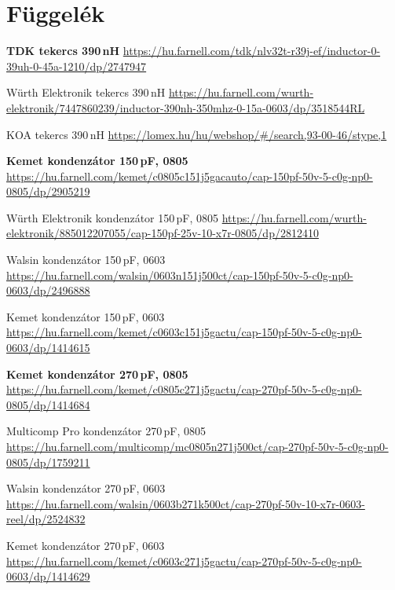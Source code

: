 \section*{Függelék}
\label{sec:fuggelek}

\begin{thebibliography}{1}
	
	 \textbf{TDK tekercs 390\,nH} \url{https://hu.farnell.com/tdk/nlv32t-r39j-ef/inductor-0-39uh-0-45a-1210/dp/2747947}
	
	 Würth Elektronik tekercs 390\,nH \url{https://hu.farnell.com/wurth-elektronik/7447860239/inductor-390nh-350mhz-0-15a-0603/dp/3518544RL}
	
	 KOA tekercs 390\,nH \url{https://lomex.hu/hu/webshop/#/search,93-00-46/stype,1}
	
	 \textbf{Kemet kondenzátor 150\,pF, 0805} \url{https://hu.farnell.com/kemet/c0805c151j5gacauto/cap-150pf-50v-5-c0g-np0-0805/dp/2905219}
	
	 Würth Elektronik kondenzátor 150\,pF, 0805 \url{https://hu.farnell.com/wurth-elektronik/885012207055/cap-150pf-25v-10-x7r-0805/dp/2812410}
	
	 Walsin kondenzátor 150\,pF, 0603 \url{https://hu.farnell.com/walsin/0603n151j500ct/cap-150pf-50v-5-c0g-np0-0603/dp/2496888}
	
	 Kemet kondenzátor 150\,pF, 0603 \url{https://hu.farnell.com/kemet/c0603c151j5gactu/cap-150pf-50v-5-c0g-np0-0603/dp/1414615}
	
	 \textbf{Kemet kondenzátor 270\,pF, 0805} \url{https://hu.farnell.com/kemet/c0805c271j5gactu/cap-270pf-50v-5-c0g-np0-0805/dp/1414684}
	
	 Multicomp Pro kondenzátor 270\,pF, 0805 \url{https://hu.farnell.com/multicomp/mc0805n271j500ct/cap-270pf-50v-5-c0g-np0-0805/dp/1759211}
	
	 Walsin kondenzátor 270\,pF, 0603 \url{https://hu.farnell.com/walsin/0603b271k500ct/cap-270pf-50v-10-x7r-0603-reel/dp/2524832}
	
	 Kemet kondenzátor 270\,pF, 0603 \url{https://hu.farnell.com/kemet/c0603c271j5gactu/cap-270pf-50v-5-c0g-np0-0603/dp/1414629}

\end{thebibliography}

\newpage


